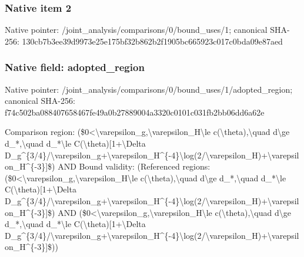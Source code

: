 \documentclass[10pt,a4paper]{article}
\begin{document}
\subsubsection{Native item 2}
Native pointer: /joint\_\allowbreak{}analysis/comparisons/0/bound\_\allowbreak{}uses/1; canonical SHA-256: 130cb7b3ee39d9973e25e175bf32b862b2f1905bc665923c017c0bda09e87aed

\subsubsection{Native field: adopted\_\allowbreak{}region}
Native pointer: /joint\_\allowbreak{}analysis/comparisons/0/bound\_\allowbreak{}uses/1/adopted\_\allowbreak{}region; canonical SHA-256: f74c502ba088407658467fe49a0b27889004a3320c0101c031fb2bb06dd6a62e

\begingroup\raggedright\sloppy Comparison region:\allowbreak{} (\$0<\textbackslash{}varepsilon\_\allowbreak{}g,\allowbreak{}\textbackslash{}varepsilon\_\allowbreak{}H\textbackslash{}le c(\textbackslash{}theta),\allowbreak{}\textbackslash{}quad d\textbackslash{}ge d\_\allowbreak{}*,\allowbreak{}\textbackslash{}quad d\_\allowbreak{}*\textbackslash{}le C(\textbackslash{}theta)[1+\textbackslash{}Delta D\_\allowbreak{}g\textasciicircum{}\{3/\allowbreak{}4\}/\allowbreak{}\textbackslash{}varepsilon\_\allowbreak{}g+\textbackslash{}varepsilon\_\allowbreak{}H\textasciicircum{}\{-4\}\textbackslash{}log(2/\allowbreak{}\textbackslash{}varepsilon\_\allowbreak{}H)+\textbackslash{}varepsilon\_\allowbreak{}H\textasciicircum{}\{-3\}]\$) AND Bound validity:\allowbreak{} (Referenced regions:\allowbreak{} (\$0<\textbackslash{}varepsilon\_\allowbreak{}g,\allowbreak{}\textbackslash{}varepsilon\_\allowbreak{}H\textbackslash{}le c(\textbackslash{}theta),\allowbreak{}\textbackslash{}quad d\textbackslash{}ge d\_\allowbreak{}*,\allowbreak{}\textbackslash{}quad d\_\allowbreak{}*\textbackslash{}le C(\textbackslash{}theta)[1+\textbackslash{}Delta D\_\allowbreak{}g\textasciicircum{}\{3/\allowbreak{}4\}/\allowbreak{}\textbackslash{}varepsilon\_\allowbreak{}g+\textbackslash{}varepsilon\_\allowbreak{}H\textasciicircum{}\{-4\}\textbackslash{}log(2/\allowbreak{}\textbackslash{}varepsilon\_\allowbreak{}H)+\textbackslash{}varepsilon\_\allowbreak{}H\textasciicircum{}\{-3\}]\$) AND (\$0<\textbackslash{}varepsilon\_\allowbreak{}g,\allowbreak{}\textbackslash{}varepsilon\_\allowbreak{}H\textbackslash{}le c(\textbackslash{}theta),\allowbreak{}\textbackslash{}quad d\textbackslash{}ge d\_\allowbreak{}*,\allowbreak{}\textbackslash{}quad d\_\allowbreak{}*\textbackslash{}le C(\textbackslash{}theta)[1+\textbackslash{}Delta D\_\allowbreak{}g\textasciicircum{}\{3/\allowbreak{}4\}/\allowbreak{}\textbackslash{}varepsilon\_\allowbreak{}g+\textbackslash{}varepsilon\_\allowbreak{}H\textasciicircum{}\{-4\}\textbackslash{}log(2/\allowbreak{}\textbackslash{}varepsilon\_\allowbreak{}H)+\textbackslash{}varepsilon\_\allowbreak{}H\textasciicircum{}\{-3\}]\$))\par\endgroup
\end{document}
